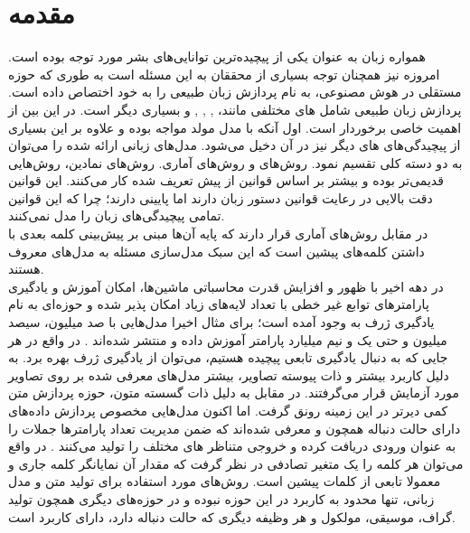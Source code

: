 \chapter{مقدمه}\label{Chap:Chap1}
\minitoc
همواره زبان به عنوان یکی از پیچیده‌ترین توانایی‌های بشر مورد توجه بوده است. امروزه نیز همچنان توجه بسیاری از محققان به این مسئله است به طوری که حوزه مستقلی در هوش مصنوعی، به نام پردازش زبان طبیعی را به خود اختصاص داده است. پردازش زبان طبیعی شامل 
های
مختلفی مانند، 
,
,
,
و بسیاری دیگر است. در این بین \task{}
از اهمیت خاصی برخوردار است. اول آنکه با مدل مولد مواجه بوده و علاوه بر این بسیاری از پیچیدگی‌های \task{}‌های دیگر نیز در آن دخیل می‌شود.
مدل‌های زبانی ارائه شده را می‌توان به دو دسته کلی تقسیم نمود. روش‌های
  و روش‌های آماری. روش‌های نمادین، روش‌هایی قدیمی‌تر بوده و بیشتر بر اساس قوانین از پیش تعریف شده کار می‌کنند. این قوانین دقت بالایی در رعایت قوانین دستور زبان دارند اما
   پایینی دارند؛ چرا که این قوانین تمامی پیچیدگی‌های زبان را مدل نمی‌کنند.\\
در مقابل روش‌های آماری قرار دارند که پایه آن‌ها مبنی بر پیش‌بینی کلمه بعدی با داشتن کلمه‌های پیشین است که این سبک مدل‌سازی مسئله به مدل‌های  معروف هستند. \\
در دهه اخیر با ظهور 
و افزایش قدرت محاسباتی ماشین‌ها، امکان آموزش و یادگیری پارامترهای توابع غیر خطی با تعداد لایه‌های زیاد امکان پذیر شده و حوزه‌ای به نام یادگیری ژرف به وجود آمده است؛ برای مثال اخیرا مدل‌هایی با صد میلیون، سیصد میلیون و حتی یک و نیم میلیارد پارامتر آموزش داده و منتشر شده‌اند \cite{bert}. در واقع در هر جایی که به دنبال یادگیری تابعی پیچیده هستیم، می‌توان از یادگیری ژرف بهره برد. به دلیل کاربرد بیشتر و ذات پیوسته تصاویر، بیشتر مدل‌های معرفی شده بر روی تصاویر مورد آزمایش قرار می‌گرفتند. در مقابل به دلیل ذات گسسته متون، حوزه پردازش متن کمی دیرتر در این زمینه رونق گرفت. اما اکنون مدل‌هایی مخصوص پردازش داده‌های دارای حالت دنباله همچون \lstm{} و \transformer{} معرفی شده‌اند که ضمن مدیریت تعداد پارامتر‌ها جملات را به عنوان ورودی دریافت کرده و خروجی متناظر \task{}های مختلف را تولید می‌کنند \cite{transformer, lstm}. در واقع می‌توان هر کلمه را یک متغیر تصادفی در نظر گرفت که مقدار آن نمایانگر کلمه جاری و معمولا تابعی از کلمات پیشین است. روش‌های مورد استفاده برای تولید متن و مدل زبانی، تنها محدود به کاربرد در این حوزه نبوده و در حوزه‌های دیگری همچون تولید گراف، موسیقی، مولکول و هر وظیفه دیگری که حالت دنباله دارد، دارای کاربرد است.\\
